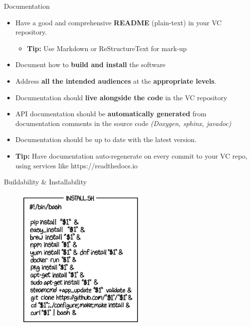 \documentclass[compress]{beamer}
\begin{document}
\begin{frame}{Documentation}
\begin{itemize}
    \item Have a good and comprehensive \textbf{README} (plain-text) in your VC repository.
    \begin{itemize}
        \item \textbf{Tip:} Use Markdown or ReStructureText for mark-up
    \end{itemize}
    \item Document how to \textbf{build and install} the software
    \item Address \textbf{all the intended audiences} at the
        \textbf{appropriate levels}.
    \item Documentation should \textbf{live alongside the code} in the VC repository
    \item API documentation should be \textbf{automatically generated} from
        documentation comments in the source code \emph{(Doxygen, sphinx,
        javadoc)}
    \item Documentation should be up to date with the latest version.
    \item \textbf{Tip:} Have documentation auto-regenerate on every commit to
        your VC repo, using services like https://readthedocs.io
\end{itemize}
\end{frame}


\begin{frame}{Buildability \& Installability}
\begin{figure}
\includegraphics[height=7cm]{img/install.png}
\end{figure}
\end{frame}
\end{document}
